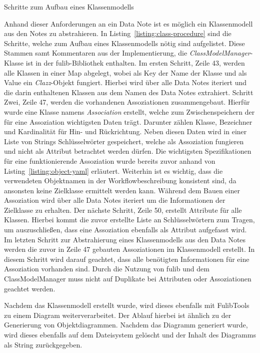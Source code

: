 \begin{listing}[!ht]
    \inputminted[xleftmargin=20pt,linenos,firstnumber=39,fontsize=\small]{java}{listings/3.1.4/ClassProcedure.java}
    \caption{Schritte zum Aufbau eines Klassenmodells}
    \label{listing:class-procedure}
\end{listing}

Anhand dieser Anforderungen an ein Data Note ist es möglich ein Klassenmodell aus den Notes zu abstrahieren.
In Listing~\ref{listing:class-procedure} sind die Schritte, welche zum Aufbau eines Klassenmodells nötig sind aufgelistet.
Diese Stammen samt Kommentaren aus der Implementierung, die \textit{ClassModelManager}-Klasse ist in der fulib-Bibliothek enthalten.
Im ersten Schritt, Zeile 43, werden alle Klassen in einer Map abgelegt, wobei als Key der Name der Klasse und als Value ein \textit{Clazz}-Objekt fungiert.
Hierbei wird über alle Data Notes iteriert und die darin enthaltenen Klassen aus dem Namen des Data Notes extrahiert.
Schritt Zwei, Zeile 47, werden die vorhandenen Assoziationen zusammengebaut.
Hierfür wurde eine Klasse namens \textit{Association} erstellt, welche zum Zwischenspeichern der für eine Assoziation wichtigsten Daten trägt.
Darunter zählen Klasse, Bezeichner und Kardinalität für Hin- und Rückrichtung.
Neben diesen Daten wird in einer Liste von Strings Schlüsselwörter gespeichert, welche als Assoziation fungieren und nicht als Attribut betrachtet werden dürfen.
Die wichtigsten Spezifikationen für eine funktionierende Assoziation wurde bereits zuvor anhand von Listing~\ref{listing:object-yaml} erläutert.
Weiterhin ist es wichtig, dass die verwendeten Objektnamen in der Workflowbeschreibung konsistent sind, da ansonsten keine Zielklasse ermittelt werden kann.
Während dem Bauen einer Assoziation wird über alle Data Notes iteriert um die Informationen der Zielklasse zu erhalten.
Der nächste Schritt, Zeile 50, erstellt Attribute für alle Klassen.
Hierbei kommt die zuvor erstellte Liste an Schlüsselwörtern zum Tragen, um auszuschließen, dass eine Assoziation ebenfalls als Attribut aufgefasst wird.
Im letzten Schritt zur Abstrahierung eines Klassenmodells aus den Data Notes werden die zuvor in Zeile 47 gebauten Assoziationen im Klassenmodell erstellt.
In diesem Schritt wird darauf geachtet, dass alle benötigten Informationen für eine Assoziation vorhanden sind.
Durch die Nutzung von fulib und dem ClassModelManager muss nicht auf Duplikate bei Attributen oder Assoziationen geachtet werden.

Nachdem das Klassenmodell erstellt wurde, wird dieses ebenfalls mit FulibTools zu einem Diagram weiterverarbeitet.
Der Ablauf hierbei ist ähnlich zu der Generierung von Objektdiagrammen.
Nachdem das Diagramm generiert wurde, wird dieses ebenfalls auf dem Dateisystem gelöscht und der Inhalt des Diagramms als String zurückgegeben.

